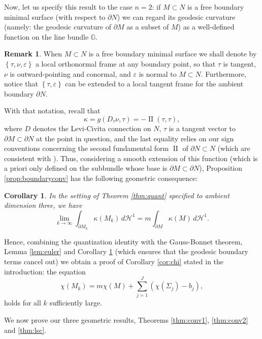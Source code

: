 \documentclass[JEP,XML,SOM,Unicode]{cedram}
\newcounter{cas}
\DeclareMathOperator{\II}{II}
\newtheorem{cor}[thm]{Corollary}
\theoremstyle{definition}
\newtheorem{rmk}[thm]{Remark}
\newcommand{\h}{\mathscr{H}}
\let\eps\varepsilon
\let\epsilon\eps
\begin{document}
Now, let us specify this result to the case $n=2$: if $M\subset N$ is a free boundary minimal surface (with respect to $\partial N$) we can regard its geodesic curvature (namely: the geodesic curvature of $\partial M$ as a subset of $M$) as a well-defined function on the line bundle $\mathbb{G}$.

\begin{rmk}\label{rem:frame}
When $M\subset N$ is a free boundary minimal surface we shall denote by $\left\{\tau,\nu,\epsilon \right\}$ a local orthonormal frame at any boundary point, so that $\tau$ is tangent, $\nu$ is outward-pointing and conormal, and $\epsilon$ is normal to $M\subset N$. Furthermore, notice that $\left\{\tau,\epsilon\right\}$ can be extended to a local tangent frame for the ambient boundary $\partial N$.
\end{rmk}
\noindent With that notation, recall that
\[
\kappa=g(D_{\tau}\nu,\tau)=-\II(\tau,\tau),
\]
where $D$ denotes the Levi-Civita connection on $N$, $\tau$ is a tangent vector to $\partial M\subset\partial N$ at the point in question, and the last equality relies on our sign conventions concerning the second fundamental form $\II$ of $\partial N\subset N$ (which are consistent with \cite{ACS17}). Thus, considering a smooth extension of this function (which is a priori only defined on the subbundle whose base is $\partial M\subset\partial N$), Proposition \ref{prop:boundaryconv} has the following geometric consequence:

\begin{cor}\label{cor:geodcurv}
In the setting of Theorem \ref{thm:quant} specified to ambient dimension three, we have
\[
\lim_{k\to\infty}\int_{\partial M_k} \kappa(M_k)\,d\h^1 = m\int_{\partial M} \kappa(M)\,d\h^1.
\]
\end{cor}

Hence, combining the quantization identity with the Gauss-Bonnet theorem, Lemma \ref{lem:euler} and Corollary \ref{cor:geodcurv} (which ensures that the geodesic boundary terms cancel out) we obtain a proof of Corollary \ref{cor:chi} stated in the introduction: the equation
\begin{equation*}
\chi(M_k)= m\chi(M)+ \sum_{j=1}^J (\chi(\Sigma_j)-b_j),
\end{equation*}
holds for all $k$ sufficiently large.

We now prove our three geometric results, Theorems \ref{thm:conv1}, \ref{thm:conv2} and \ref{thm:lsc}.
\end{document}
